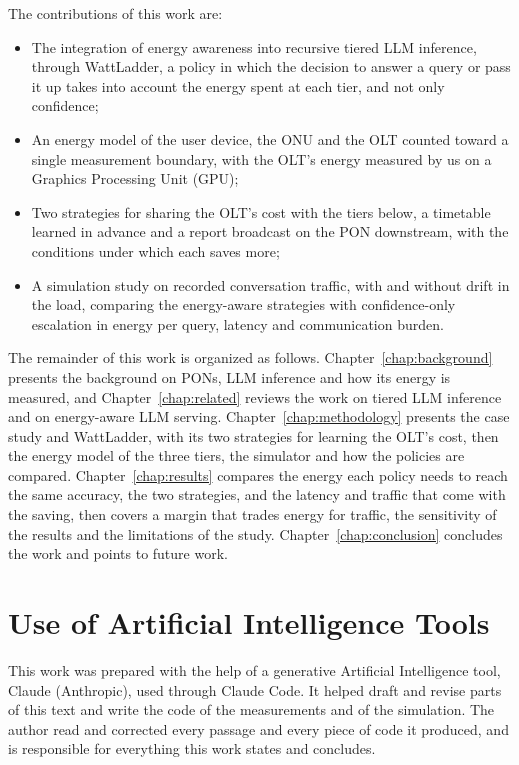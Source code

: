 \documentclass[cic,dipl,english]{infufrgs}
\begin{document}
The contributions of this work are:
\begin{itemize}
  \item The integration of energy awareness into recursive tiered LLM inference, through
  WattLadder, a policy in which the decision to answer a query or pass it up takes into
  account the energy spent at each tier, and not only confidence;
  \item An energy model of the user device, the ONU and the OLT counted toward a single
  measurement boundary, with the OLT's energy measured by us on a Graphics Processing Unit (GPU);
  \item Two strategies for sharing the OLT's cost with the tiers below, a timetable learned
  in advance and a report broadcast on the PON downstream, with the conditions under which
  each saves more;
  \item A simulation study on recorded conversation traffic, with and without
  drift in the load, comparing the energy-aware strategies with confidence-only
  escalation in energy per query, latency and communication burden.
\end{itemize}

The remainder of this work is organized as follows. Chapter~\ref{chap:background}
presents the background on PONs, LLM inference and how its energy is measured, and
Chapter~\ref{chap:related} reviews the work on tiered LLM inference and on energy-aware
LLM serving. Chapter~\ref{chap:methodology} presents the case study and WattLadder, with its two strategies
for learning the OLT's cost, then the energy model of the three tiers, the simulator and how the
policies are compared. Chapter~\ref{chap:results} compares the energy each policy needs to reach
the same accuracy, the two strategies, and the latency and traffic that come with the saving,
then covers a margin that trades energy for traffic, the sensitivity of the results and the
limitations of the study. Chapter~\ref{chap:conclusion} concludes the work and points to future
work.

\section{Use of Artificial Intelligence Tools}
\label{sec:ai-tools}
This work was prepared with the help of a generative Artificial Intelligence tool,
Claude (Anthropic), used through Claude Code. It helped draft and revise parts of this
text and write the code of the measurements and of the simulation. The author read and corrected every passage and every piece of code
it produced, and is responsible for everything this work states and concludes.
\end{document}
